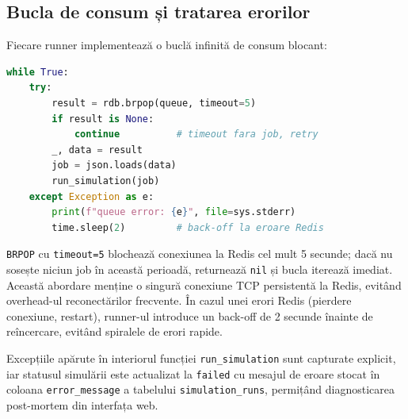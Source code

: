 \subsection{Bucla de consum și tratarea erorilor}
\label{subsec:consumer_loop}

Fiecare runner implementează o buclă infinită de consum blocant:

\begin{lstlisting}[language=Python, caption={Bucla generică de consum Redis (ilustrată în Python).}]
while True:
    try:
        result = rdb.brpop(queue, timeout=5)
        if result is None:
            continue          # timeout fara job, retry
        _, data = result
        job = json.loads(data)
        run_simulation(job)
    except Exception as e:
        print(f"queue error: {e}", file=sys.stderr)
        time.sleep(2)         # back-off la eroare Redis
\end{lstlisting}

\texttt{BRPOP} cu \texttt{timeout=5} blochează conexiunea la Redis
cel mult 5 secunde; dacă nu sosește niciun job în această perioadă,
returnează \texttt{nil} și bucla iterează imediat. Această abordare
menține o singură conexiune TCP persistentă la Redis, evitând
overhead-ul reconectărilor frecvente. În cazul unei erori Redis
(pierdere conexiune, restart), runner-ul introduce un back-off de 2
secunde înainte de reîncercare, evitând spiralele de erori rapide.

Excepțiile apărute în interiorul funcției \texttt{run\_simulation}
sunt capturate explicit, iar statusul simulării este actualizat la
\texttt{failed} cu mesajul de eroare stocat în coloana
\texttt{error\_message} a tabelului \texttt{simulation\_runs},
permițând diagnosticarea post-mortem din interfața web.
